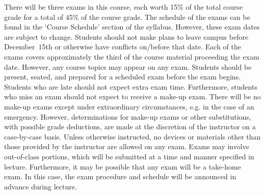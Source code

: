 \documentclass[11pt,letterpaper]{article}
\begin{document}
There will be three exams in this course, each worth 15\% of the total course grade for a total of 45\% of the course grade. The schedule of the exams can be found in the `Course Schedule' section of the syllabus. However, these exam dates are subject to change. Students should not make plans to leave campus before December~15th or otherwise have conflicts on/before that date. Each of the exams covers approximately the third of the course material proceeding the exam date. However, any course topics may appear on any exam. Students should be present, seated, and prepared for a scheduled exam before the exam begins. Students who are late should not expect extra exam time. Furthermore, students who miss an exam should not expect to receive a make-up exam. There will be no make-up exams except under extraordinary circumstances, e.g. in the case of an emergency. However, determinations for make-up exams or other substitutions, with possible grade deductions, are made at the discretion of the instructor on a case-by-case basis. Unless otherwise instructed, no devices or materials other than those provided by the instructor are allowed on any exam. Exams may involve out-of-class portions, which will be submitted at a time and manner specified in lecture. Furthermore, it may be possible that any exam will be a take-home exam. In this case, the exam procedure and schedule will be announced in advance during lecture. \pspace
\end{document}
